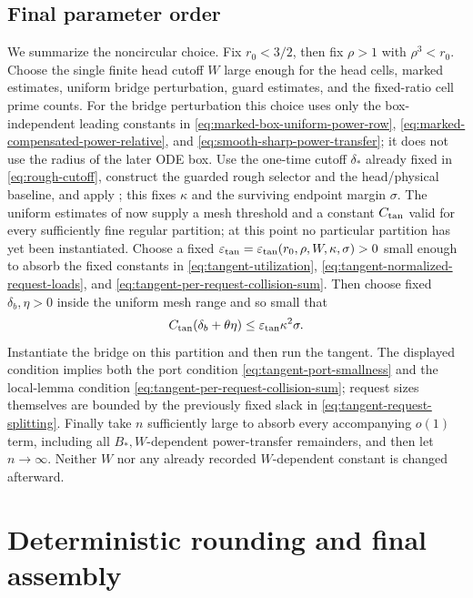 \documentclass[11pt]{article}
\numberwithin{equation}{section}
\theoremstyle{definition}
\theoremstyle{remark}
\newcommand{\1}{\mathbf 1}
\begin{document}
\subsection{Final parameter order}
\label{subsec:tangent-parameter-order}

We summarize the noncircular choice.  Fix \(r_0<3/2\), then fix
\(\rho>1\) with \(\rho^3<r_0\).  Choose the single finite head cutoff
\(W\) large enough for the head cells, marked estimates, uniform bridge
perturbation, guard estimates, and the fixed-ratio cell prime counts.
For the bridge perturbation this choice uses only the box-independent
leading constants in
\eqref{eq:marked-box-uniform-power-row},
\eqref{eq:marked-compensated-power-relative}, and
\eqref{eq:smooth-sharp-power-transfer}; it does not use the radius of
the later ODE box.
Use the one-time cutoff \(\delta_*\) already fixed in
\eqref{eq:rough-cutoff}, construct the guarded rough selector and the
head/physical baseline, and apply ; this
fixes \(\kappa\) and the surviving endpoint margin \(\sigma\).  The
uniform estimates of  now supply a
mesh threshold and a constant \(C_{\rm tan}\) valid for every sufficiently
fine regular partition; at this point no particular partition has yet been
instantiated.  Choose a fixed
\(\varepsilon_{\rm tan}=\varepsilon_{\rm tan}
(r_0,\rho,W,\kappa,\sigma)>0\) small enough to absorb the fixed constants
in \eqref{eq:tangent-utilization},
\eqref{eq:tangent-normalized-request-loads}, and
\eqref{eq:tangent-per-request-collision-sum}.  Then choose fixed
\(\delta_b,\eta>0\) inside the uniform mesh range and so small that
\begin{equation}
 C_{\rm tan}(\delta_b+\theta\eta)
       \leq\varepsilon_{\rm tan}\kappa^2\sigma.
\label{eq:tangent-final-smallness}
\end{equation}
Instantiate the bridge on this partition and then run the tangent.  The
displayed condition implies both the port condition
\eqref{eq:tangent-port-smallness} and the local-lemma condition
\eqref{eq:tangent-per-request-collision-sum}; request sizes themselves are
bounded by the previously fixed slack in
\eqref{eq:tangent-request-splitting}.  Finally take \(n\) sufficiently
large to absorb every accompanying \(o(1)\) term, including all
\(B_*,W\)-dependent power-transfer remainders, and then let
\(n\to\infty\).
Neither \(W\) nor any already recorded \(W\)-dependent constant is changed
afterward.
 \section{Deterministic rounding and final assembly}
\label{sec:rounding-assembly}
\end{document}
